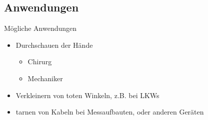 \subsection{Anwendungen}
\begin{frame}{M\"ogliche Anwendungen}
  \begin{itemize}
    \item Durchschauen der H\"ande
      \begin{itemize}
        \item Chirurg
        \item Mechaniker
      \end{itemize}
    \item Verkleinern von toten Winkeln, z.B. bei LKWs
    \item tarnen von Kabeln bei Messaufbauten, oder anderen Ger\"aten
  \end{itemize}
\end{frame}
